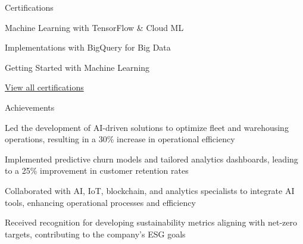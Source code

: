 \documentclass{resume} %
\begin{document}
    \begin{rSection}{Certifications}
        \begin{rSubsection}{}{}{}
                            \item Machine Learning with TensorFlow \& Cloud ML
                            \item Implementations with BigQuery for Big Data
                            \item Getting Started with Machine Learning
                    \end{rSubsection}
        \href{https://skillsoft.digitalbadges.skillsoft.com/profile/umairsaeed185770/wallet}{View all certifications}
    \end{rSection}

    \begin{rSection}{Achievements}
        \begin{rSubsection}{}{}{}
                            \item Led the development of AI{-}driven solutions to optimize fleet and warehousing operations, resulting in a 30\% increase in operational efficiency
                            \item Implemented predictive churn models and tailored analytics dashboards, leading to a 25\% improvement in customer retention rates
                            \item Collaborated with AI, IoT, blockchain, and analytics specialists to integrate AI tools, enhancing operational processes and efficiency
                            \item Received recognition for developing sustainability metrics aligning with net{-}zero targets, contributing to the company's ESG goals
                    \end{rSubsection}
    \end{rSection}
\end{document}
